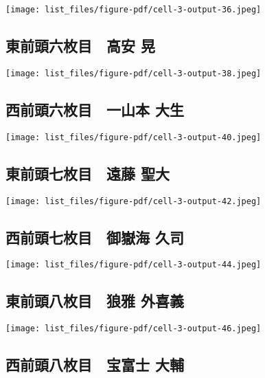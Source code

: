 \documentclass[
]{bxjsarticle}
\begin{document}
\texttt{[image: list\_files/figure-pdf/cell-3-output-36.jpeg]}

\subsection{東前頭六枚目　高安
晃}\label{ux6771ux524dux982dux516dux679aux76ee-ux9ad8ux5b89-ux6643}

\texttt{[image: list\_files/figure-pdf/cell-3-output-38.jpeg]}

\subsection{西前頭六枚目　一山本
大生}\label{ux897fux524dux982dux516dux679aux76ee-ux4e00ux5c71ux672c-ux5927ux751f}

\texttt{[image: list\_files/figure-pdf/cell-3-output-40.jpeg]}

\subsection{東前頭七枚目　遠藤
聖大}\label{ux6771ux524dux982dux4e03ux679aux76ee-ux9060ux85e4-ux8056ux5927}

\texttt{[image: list\_files/figure-pdf/cell-3-output-42.jpeg]}

\subsection{西前頭七枚目　御嶽海
久司}\label{ux897fux524dux982dux4e03ux679aux76ee-ux5fa1ux5dbdux6d77-ux4e45ux53f8}

\texttt{[image: list\_files/figure-pdf/cell-3-output-44.jpeg]}

\subsection{東前頭八枚目　狼雅
外喜義}\label{ux6771ux524dux982dux516bux679aux76ee-ux72fcux96c5-ux5916ux559cux7fa9}

\texttt{[image: list\_files/figure-pdf/cell-3-output-46.jpeg]}

\subsection{西前頭八枚目　宝富士
大輔}\label{ux897fux524dux982dux516bux679aux76ee-ux5b9dux5bccux58eb-ux5927ux8f14}
\end{document}
